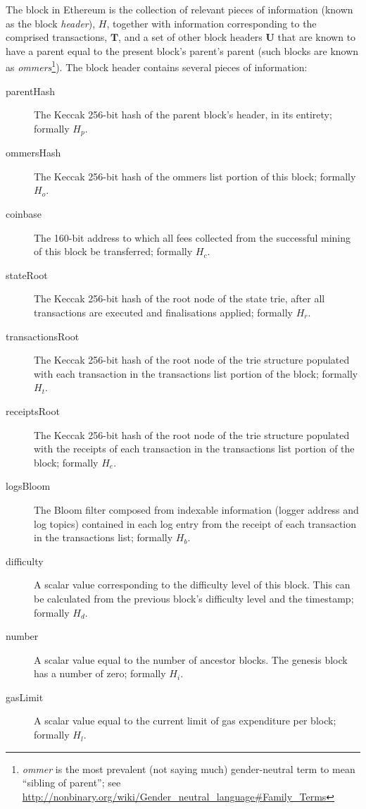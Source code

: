 \documentclass[9pt,oneside]{amsart}
\begin{document}
\begin{multicols}{2}
The block in Ethereum is the collection of relevant pieces of information (known as the block \textit{header}), $H$, together with information corresponding to the comprised transactions, $\mathbf{T}$, and a set of other block headers $\mathbf{U}$ that are known to have a parent equal to the present block's parent's parent (such blocks are known as \textit{ommers}\footnote{\textit{ommer} is the most prevalent (not saying much) gender-neutral term to mean ``sibling of parent''; see \url{http://nonbinary.org/wiki/Gender_neutral_language#Family_Terms}}). The block header contains several pieces of information:


\begin{description}
\item[parentHash] The Keccak 256-bit hash of the parent block's header, in its entirety; formally $H_p$.
\item[ommersHash] The Keccak 256-bit hash of the ommers list portion of this block; formally $H_o$.
\item[coinbase] The 160-bit address to which all fees collected from the successful mining of this block be transferred; formally $H_c$.
\item[stateRoot] The Keccak 256-bit hash of the root node of the state trie, after all transactions are executed and finalisations applied; formally $H_r$.
\item[transactionsRoot] The Keccak 256-bit hash of the root node of the trie structure populated with each transaction in the transactions list portion of the block; formally $H_t$.
\item[receiptsRoot] The Keccak 256-bit hash of the root node of the trie structure populated with the receipts of each transaction in the transactions list portion of the block; formally $H_e$.
\item[logsBloom] The Bloom filter composed from indexable information (logger address and log topics) contained in each log entry from the receipt of each transaction in the transactions list; formally $H_b$.
\item[difficulty] A scalar value corresponding to the difficulty level of this block. This can be calculated from the previous block's difficulty level and the timestamp; formally $H_d$.
\item[number] A scalar value equal to the number of ancestor blocks. The genesis block has a number of zero; formally $H_i$.
\item[gasLimit] A scalar value equal to the current limit of gas expenditure per block; formally $H_l$.

\end{description}
\end{multicols}
\end{document}
